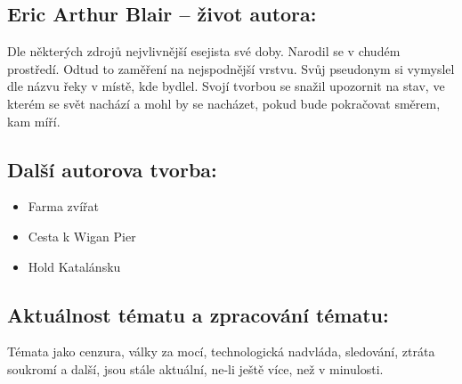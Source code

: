 \documentclass[A4paper]{extarticle} %
\begin{document}

\subsection*{Eric Arthur Blair {\ssmall -- život autora:}}
\noindent 
Dle některých zdrojů nejvlivnější esejista své doby. Narodil se v chudém prostředí. Odtud to zaměření na nejspodnější vrstvu. Svůj pseudonym si vymyslel dle názvu řeky v místě, kde bydlel. Svojí tvorbou se snažil upozornit na stav, ve kterém se svět nachází a mohl by se nacházet, pokud bude pokračovat směrem, kam míří.


\subsection*{Další autorova tvorba:}
\noindent 
\begin{itemize}
    \item Farma zvířat
    \item Cesta k Wigan Pier
    \item Hold Katalánsku
\end{itemize}




\subsection*{Aktuálnost tématu a zpracování tématu:}
\noindent
Témata jako cenzura, války za mocí, technologická nadvláda, sledování, ztráta soukromí a další, jsou stále aktuální, ne-li ještě více, než v minulosti.
\end{document}
